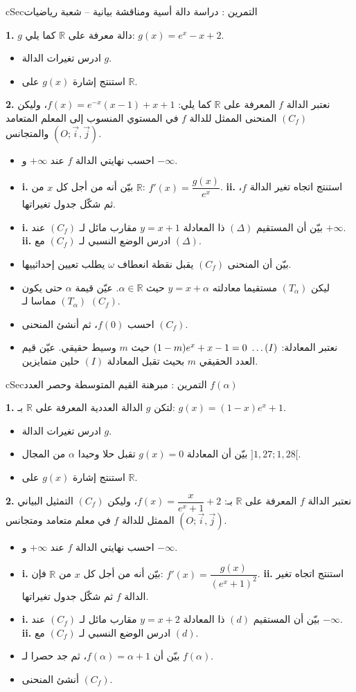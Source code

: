 \documentclass[12pt,a4paper]{article}
\newenvironment{BOX}[2]{\begin{otherlanguage}{english}\begin{arbox}{#1}{#2}}{\end{arbox}\end{otherlanguage}}
\newcounter{exo}
\newenvironment{tamrin}[1]{\stepcounter{exo}\begin{BOX}{cSec}{التمرين \theexo: #1}}{\end{BOX}}
\renewcommand{\ldots}{\mathinner{\ldotp\ldotp\ldotp}}
\newcommand{\R}{\mathbb{R}}
\newenvironment{sq}{\begin{itemize}[leftmargin=2.4em,itemsep=3pt]}{\end{itemize}}
\newcommand{\qa}{\item[(أ)]}\newcommand{\qb}{\item[(ب)]}\newcommand{\qc}{\item[(جـ)]}\newcommand{\qd}{\item[(د)]}\newcommand{\qe}{\item[(هـ)]}
\newcommand{\QQ}[1]{\par\smallskip\textbf{#1.} }
\begin{document}
\begin{tamrin}{دراسة دالة أسية ومناقشة بيانية -- شعبة رياضيات}
\QQ{1} $g$ دالة معرفة على $\R$ كما يلي: $g(x)=e^{x}-x+2$.
\begin{sq}
\qa ادرس تغيرات الدالة $g$.
\qb استنتج إشارة $g(x)$ على $\R$.
\end{sq}
\QQ{2} نعتبر الدالة $f$ المعرفة على $\R$ كما يلي: $f(x)=e^{-x}(x-1)+x+1$، وليكن $(C_f)$ المنحنى الممثل للدالة $f$ في المستوي المنسوب إلى المعلم المتعامد والمتجانس $\left(O;\vec i,\vec j\right)$.
\begin{sq}
\qa احسب نهايتي الدالة $f$ عند $+\infty$ و $-\infty$.
\qb \textbf{i.} بيّن أنه من أجل كل $x$ من $\R$: $f'(x)=\dfrac{g(x)}{e^{x}}$. \quad \textbf{ii.} استنتج اتجاه تغير الدالة $f$، ثم شكّل جدول تغيراتها.
\qc \textbf{i.} بيّن أن المستقيم $(\Delta)$ ذا المعادلة $y=x+1$ مقارب مائل لـ $(C_f)$ عند $+\infty$. \quad \textbf{ii.} ادرس الوضع النسبي لـ $(C_f)$ مع $(\Delta)$.
\qd بيّن أن المنحنى $(C_f)$ يقبل نقطة انعطاف $\omega$ يطلب تعيين إحداثييها.
\qe ليكن $(T_\alpha)$ مستقيما معادلته $y=x+\alpha$ حيث $\alpha\in\R$. عيّن قيمة $\alpha$ حتى يكون $(T_\alpha)$ مماسا لـ $(C_f)$.
\item[(و)] احسب $f(0)$، ثم أنشئ المنحنى $(C_f)$.
\item[(ز)] نعتبر المعادلة: $(1-m)e^{x}+x-1=0\ \ldots(I)$ حيث $m$ وسيط حقيقي. عيّن قيم العدد الحقيقي $m$ بحيث تقبل المعادلة $(I)$ حلين متمايزين.
\end{sq}
\end{tamrin}

\begin{tamrin}{مبرهنة القيم المتوسطة وحصر العدد $f(\alpha)$}
\QQ{1} لتكن $g$ الدالة العددية المعرفة على $\R$ بـ: $g(x)=(1-x)e^{x}+1$.
\begin{sq}
\qa ادرس تغيرات الدالة $g$.
\qb بيّن أن المعادلة $g(x)=0$ تقبل حلا وحيدا $\alpha$ من المجال $]1{,}27;1{,}28[$.
\qc استنتج إشارة $g(x)$ على $\R$.
\end{sq}
\QQ{2} نعتبر الدالة $f$ المعرفة على $\R$ بـ: $f(x)=\dfrac{x}{e^{x}+1}+2$، وليكن $(C_f)$ التمثيل البياني الممثل للدالة $f$ في معلم متعامد ومتجانس $\left(O;\vec i,\vec j\right)$.
\begin{sq}
\qa احسب نهايتي الدالة $f$ عند $+\infty$ و $-\infty$.
\qb \textbf{i.} بيّن أنه من أجل كل $x$ من $\R$ فإن: $f'(x)=\dfrac{g(x)}{\left(e^{x}+1\right)^{2}}$. \quad \textbf{ii.} استنتج اتجاه تغير الدالة $f$ ثم شكّل جدول تغيراتها.
\qc \textbf{i.} بيّن أن المستقيم $(d)$ ذا المعادلة $y=x+2$ مقارب مائل لـ $(C_f)$ عند $-\infty$. \quad \textbf{ii.} ادرس الوضع النسبي لـ $(C_f)$ مع $(d)$.
\qd بيّن أن $f(\alpha)=\alpha+1$، ثم جد حصرا لـ $f(\alpha)$.
\qe أنشئ المنحنى $(C_f)$.
\end{sq}
\end{tamrin}
\end{document}
